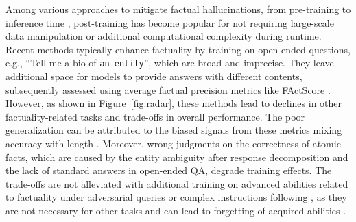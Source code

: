 Among various approaches to mitigate factual hallucinations, from pre-training \citep{gardent2017creating,wang2019revisiting} to inference time \citep{nakano2021webgpt,dola}, post-training \citep{flame, facttune} has become popular for not requiring large-scale data manipulation or additional computational complexity during runtime. Recent methods typically enhance factuality by training on open-ended questions, e.g., ``Tell me a bio of \texttt{an entity}'', which are broad and imprecise. They leave additional space for models to provide answers with different contents, subsequently assessed using average factual precision metrics like FActScore \citep{factscore}. However, as shown in Figure~\ref{fig:radar}, these methods lead to declines in other factuality-related tasks and trade-offs in overall performance. The poor generalization can be attributed to the biased signals from these metrics mixing accuracy with length \citep{wei2024long}. Moreover, wrong judgments on the correctness of atomic facts, which are caused by the entity ambiguity after response decomposition \citep{chiang2024merging, wanner2024dndscore} and the lack of standard answers in open-ended QA, degrade training effects. The trade-offs are not alleviated with additional training on advanced abilities \citep{zhao2023survey} related to factuality under adversarial queries \citep{self-eval-skt} or complex instructions following \citep{flame}, as they are not necessary for other tasks and can lead to forgetting of acquired abilities \citep{ouyang2022training, lin2024mitigating}.


